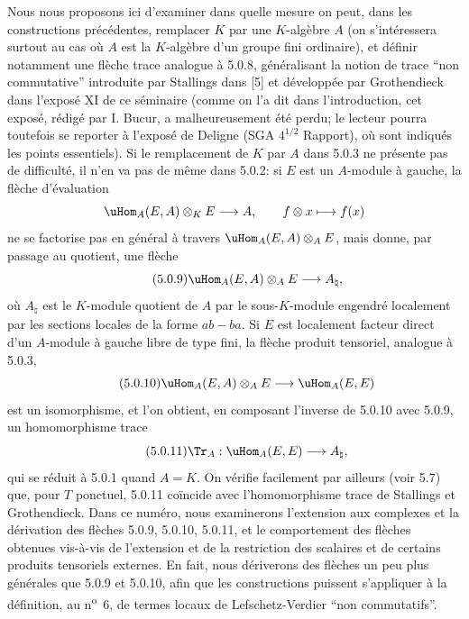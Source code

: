 Nous nous proposons ici d'examiner dans quelle mesure on peut, dans les constructions précédentes, remplacer $K$ par une $K$-algèbre $A$ (on s'intéressera surtout au cas où $A$ est la $K$-algèbre d'un groupe fini ordinaire), et définir notamment une flèche trace analogue à 5.0.8, généralisant la notion de trace ``non commutative'' introduite par Stallings dans [5] et développée par Grothendieck dans l'exposé XI de ce séminaire (comme on l'a dit dans l'introduction, cet exposé, rédigé par I. Bucur, a malheureusement été perdu; le lecteur pourra toutefois se reporter à l'exposé de Deligne (SGA $4^{1/2}$ Rapport), où sont indiqués les points essentiels). Si le remplacement de $K$ par $A$ dans 5.0.3 ne présente pas de difficulté, il n'en va pas de même dans 5.0.2: si $E$ est un $A$-module à gauche, la flèche d'évaluation
\[
\uHom_A(E,A)\otimes_KE\longrightarrow A,
\qquad f\otimes x\longmapsto f(x)
\]
ne se factorise pas en général à travers $\uHom_A(E,A)\otimes_AE$, mais donne, par passage au quotient, une flèche
\begin{equation}\tag{5.0.9}
\uHom_A(E,A)\otimes_AE\longrightarrow A_\natural,
\end{equation}
où $A_\natural$ est le $K$-module quotient de $A$ par le sous-$K$-module engendré localement par les sections locales de la forme $ab-ba$. Si $E$ est localement facteur direct d'un $A$-module à gauche libre de type fini, la flèche produit tensoriel, analogue à 5.0.3,
\begin{equation}\tag{5.0.10}
\uHom_A(E,A)\otimes_AE\longrightarrow\uHom_A(E,E)
\end{equation}
est un isomorphisme, et l'on obtient, en composant l'inverse de 5.0.10 avec 5.0.9, un homomorphisme trace
\begin{equation}\tag{5.0.11}
\Tr_A:\uHom_A(E,E)\longrightarrow A_\natural,
\end{equation}
qui se réduit à 5.0.1 quand $A=K$. On vérifie facilement par ailleurs (voir 5.7) que, pour $T$ ponctuel, 5.0.11 coïncide avec l'homomorphisme trace de Stallings et Grothendieck. Dans ce numéro, nous examinerons l'extension aux complexes et la dérivation des flèches 5.0.9, 5.0.10, 5.0.11, et le comportement des flèches obtenues vis-à-vis de l'extension et de la restriction des scalaires et de certains produits tensoriels externes. En fait, nous dériverons des flèches un peu plus générales que 5.0.9 et 5.0.10, afin que les constructions puissent s'appliquer à la définition, au n\textsuperscript{o}~6, de termes locaux de Lefschetz-Verdier ``non commutatifs''.

